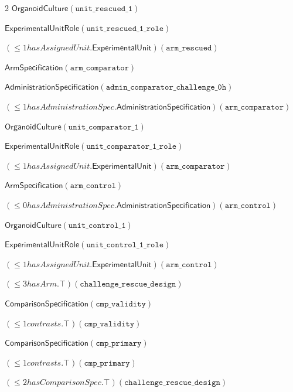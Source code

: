\documentclass[10pt,a4paper]{article}
\begin{document}
{\begin{multicols}{2}
$\mathsf{OrganoidCulture}(\mathtt{unit\_\allowbreak{}rescued\_\allowbreak{}1})$\par
$\mathsf{ExperimentalUnitRole}(\mathtt{unit\_\allowbreak{}rescued\_\allowbreak{}1\_\allowbreak{}role})$\par
$(≤1 \mathit{hasAssignedUnit}.\mathsf{ExperimentalUnit})(\mathtt{arm\_\allowbreak{}rescued})$\par
$\mathsf{ArmSpecification}(\mathtt{arm\_\allowbreak{}comparator})$\par
$\mathsf{AdministrationSpecification}(\mathtt{admin\_\allowbreak{}comparator\_\allowbreak{}challenge\_\allowbreak{}0h})$\par
$(≤1 \mathit{hasAdministrationSpec}.\mathsf{AdministrationSpecification})(\mathtt{arm\_\allowbreak{}comparator})$\par
$\mathsf{OrganoidCulture}(\mathtt{unit\_\allowbreak{}comparator\_\allowbreak{}1})$\par
$\mathsf{ExperimentalUnitRole}(\mathtt{unit\_\allowbreak{}comparator\_\allowbreak{}1\_\allowbreak{}role})$\par
$(≤1 \mathit{hasAssignedUnit}.\mathsf{ExperimentalUnit})(\mathtt{arm\_\allowbreak{}comparator})$\par
$\mathsf{ArmSpecification}(\mathtt{arm\_\allowbreak{}control})$\par
$(≤0 \mathit{hasAdministrationSpec}.\mathsf{AdministrationSpecification})(\mathtt{arm\_\allowbreak{}control})$\par
$\mathsf{OrganoidCulture}(\mathtt{unit\_\allowbreak{}control\_\allowbreak{}1})$\par
$\mathsf{ExperimentalUnitRole}(\mathtt{unit\_\allowbreak{}control\_\allowbreak{}1\_\allowbreak{}role})$\par
$(≤1 \mathit{hasAssignedUnit}.\mathsf{ExperimentalUnit})(\mathtt{arm\_\allowbreak{}control})$\par
$(≤3 \mathit{hasArm}.⊤)(\mathtt{challenge\_\allowbreak{}rescue\_\allowbreak{}design})$\par
$\mathsf{ComparisonSpecification}(\mathtt{cmp\_\allowbreak{}validity})$\par
$(≤1 \mathit{contrasts}.⊤)(\mathtt{cmp\_\allowbreak{}validity})$\par
$\mathsf{ComparisonSpecification}(\mathtt{cmp\_\allowbreak{}primary})$\par
$(≤1 \mathit{contrasts}.⊤)(\mathtt{cmp\_\allowbreak{}primary})$\par
$(≤2 \mathit{hasComparisonSpec}.⊤)(\mathtt{challenge\_\allowbreak{}rescue\_\allowbreak{}design})$\par

\end{multicols}}
\end{document}
